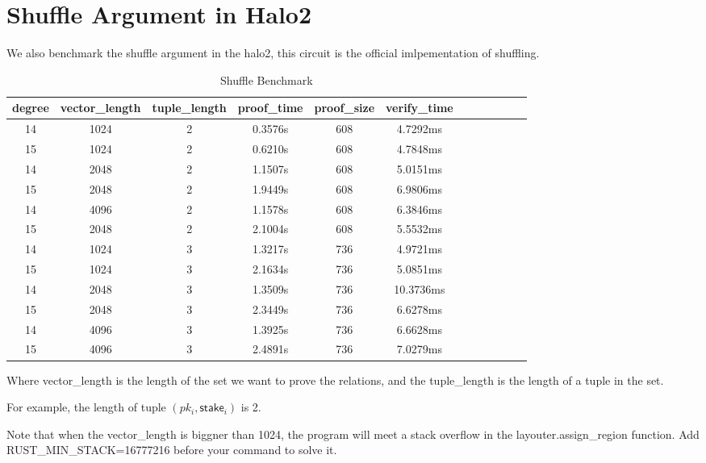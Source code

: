 \documentclass{article}
\begin{document}
\section{Shuffle Argument in Halo2}

We also benchmark the shuffle argument in the halo2, this circuit is the official imlpementation of shuffling.


\begin{table}[h!]
\centering
\begin{tabular}{|c|c|c|c|c|c|c|c|c|c|c|c|}
\hline
\textbf{degree}    & \textbf{vector\_length}  & \textbf{tuple\_length}& \textbf{proof\_time} & \textbf{proof\_size} & \textbf{verify\_time} \\ \hline
14   & 1024 & 2 & 0.3576s & 608 & 4.7292ms \\ \hline
15   & 1024 & 2 & 0.6210s & 608 & 4.7848ms \\ \hline
14   & 2048 & 2 & 1.1507s & 608 & 5.0151ms \\ \hline
15   & 2048 & 2 & 1.9449s & 608 & 6.9806ms \\ \hline
14   & 4096 & 2 & 1.1578s & 608 & 6.3846ms \\ \hline
15   & 2048 & 2 & 2.1004s & 608 & 5.5532ms \\ \hline
14   & 1024 & 3 & 1.3217s & 736 & 4.9721ms \\ \hline
15   & 1024 & 3 & 2.1634s & 736 & 5.0851ms \\ \hline
14   & 2048 & 3 & 1.3509s & 736 & 10.3736ms \\ \hline
15   & 2048 & 3 & 2.3449s & 736 & 6.6278ms \\ \hline
14   & 4096 & 3 & 1.3925s & 736 & 6.6628ms \\ \hline
15   & 4096 & 3 & 2.4891s & 736 & 7.0279ms \\ \hline
\hline
\end{tabular}
\caption{Shuffle Benchmark}
\label{tab:data_table}
\end{table}


Where vector\_length is the length of the set we want to prove the relations, and the tuple\_length is the length of a tuple in the set.

For example, the length of tuple $(pk_i, \mathsf{stake}_i)$ is 2.

Note that when the vector\_length is biggner than 1024, the program will meet a stack overflow in the layouter.assign\_region function. Add RUST\_MIN\_STACK=16777216 before your command to solve it.
\end{document}
